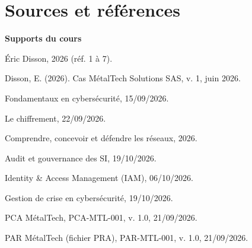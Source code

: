 \documentclass[11pt,a4paper]{article}
\begin{document}
\section*{Sources et références}
{}
\begingroup
\small
\setlength{\parindent}{0pt}
\setlength{\parskip}{1.5pt}
\noindent
\begin{minipage}[t]{0.48\textwidth}
\raggedright
{\large\bfseries\color{teal} Supports du cours}\par
{\footnotesize\color{graytext} Éric Disson, 2026 (réf. 1 à 7).}\par
[1] Disson, E. (2026). Cas MétalTech Solutions SAS, v. 1, juin 2026.\par
[2] Fondamentaux en cybersécurité, 15/09/2026.\par
[3] Le chiffrement, 22/09/2026.\par
[4] Comprendre, concevoir et défendre les réseaux, 2026.\par
[5] Audit et gouvernance des SI, 19/10/2026.\par
[6] Identity \& Access Management (IAM), 06/10/2026.\par
[7] Gestion de crise en cybersécurité, 19/10/2026.\par
[8] PCA MétalTech, PCA-MTL-001, v. 1.0, 21/09/2026.\par
[9] PAR MétalTech (fichier PRA), PAR-MTL-001, v. 1.0, 21/09/2026.\par
\end{minipage}\hfill
\end{document}
